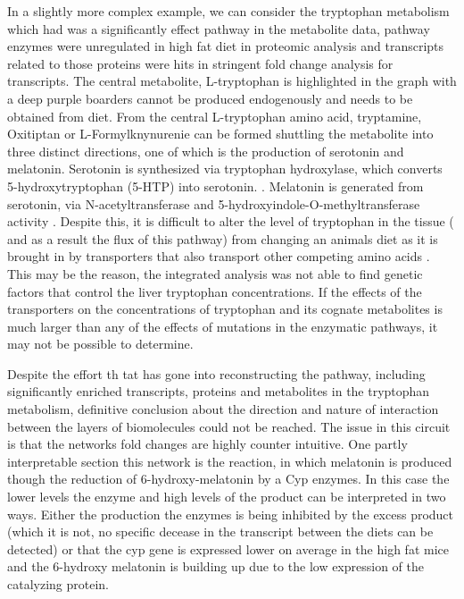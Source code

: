 \documentclass[a4paper]{book}
\begin{document}
	
	In a slightly more complex example, we can consider the tryptophan metabolism which had was a significantly effect pathway in the metabolite data, pathway enzymes were unregulated in high fat diet in proteomic analysis and transcripts related to those proteins were hits in stringent fold change analysis for transcripts. The central metabolite, L-tryptophan is highlighted in the graph with a deep purple boarders cannot be produced endogenously and needs to be obtained from diet. From the central L-tryptophan amino acid, tryptamine, Oxitiptan or L-Formylknynurenie can be formed shuttling the metabolite into three distinct directions, one of which is the production of serotonin and melatonin. Serotonin is synthesized via tryptophan hydroxylase, which converts 5-hydroxytryptophan (5-HTP) into serotonin. \citep{Schaechter1990,Fernstrom1983} . Melatonin is generated from serotonin, via N-acetyltransferase and 5-hydroxyindole-O-methyltransferase activity \citep{WURTMAN1969}. Despite this, it is difficult to alter the level of tryptophan in the tissue ( and as a result the flux of this pathway) from changing an animals diet as it is brought in by transporters that also transport other competing amino acids \citep{Robinson2009}. This may be the reason, the integrated analysis was not able to find genetic factors that control the liver tryptophan concentrations. If the effects of the transporters on the concentrations of tryptophan and its cognate metabolites is much larger than any of the effects of mutations in the enzymatic pathways, it may not be possible to determine.
	
	 Despite the effort th tat has gone into reconstructing the pathway, including  significantly enriched transcripts, proteins and metabolites in the tryptophan metabolism, definitive conclusion about the direction and nature of interaction between the layers of biomolecules could not be reached. The issue in this circuit is that the networks fold changes are highly counter intuitive. One partly interpretable section this network is the reaction, in which melatonin is produced though the reduction of 6-hydroxy-melatonin by a Cyp enzymes. In this case the lower levels the enzyme and  high levels of the product can be interpreted in two ways. Either the production the enzymes is being inhibited by the excess product (which it is not, no specific decease in the transcript between the diets can be detected) or that the cyp gene is expressed lower on average in the high fat mice and the 6-hydroxy melatonin is building up due to the low expression of the catalyzing protein.
	 
\end{document}
